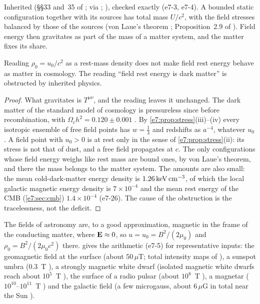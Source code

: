 Inherited (\S\S33 and~35 of \cite{LandauLifshitz2}; \cite{Rainich1925} via \cite{RE}; \cite{WeinbergCosmo08}), checked exactly (e7-3, e7-4). A
bounded static configuration together with its sources has total mass $U/c^2$, with the field stresses balanced by those of the sources (von Laue's
theorem \cite{Laue1911}; Proposition~2.9 of \cite{RE}). Field energy then gravitates as part of the mass of a matter system, and the matter fixes
its share.

\begin{corollary}
\label{e7:cor:dm}
Reading $\rho_0=u_0/c^2$ as a rest-mass density does not make field rest energy behave as matter in cosmology. The reading ``field rest energy is
dark matter'' is obstructed by inherited physics.
\end{corollary}

\begin{proof}
What gravitates is $T^{\mu\nu}$, and the reading leaves it unchanged. The dark matter of the standard model of cosmology is pressureless
since before recombination, with $\Omega_ch^2=0.120\pm0.001$ \cite{Planck18VI}. By \cref{e7:prop:stress}(iii)--(iv) every isotropic ensemble
of free field points has $w=\tfrac13$ and redshifts as $a^{-4}$, whatever $u_0$. A field point with $u_0>0$ is at rest only in the sense of
\cref{e7:prop:stress}(ii): its stress is not that of dust, and a free field propagates at $c$. The only configurations whose field energy
weighs like rest mass are bound ones, by von Laue's theorem, and there the mass belongs to the matter system. The amounts are also small: the
mean cold-dark-matter energy density is $1.26\,{\rm keV\,cm^{-3}}$, of which the local galactic magnetic energy density is $7\times10^{-4}$ and the
mean rest energy of the CMB (\cref{e7:sec:cmb}) $1.4\times10^{-4}$ (e7-26). The cause of the obstruction is the tracelessness, not the deficit.
\end{proof}

The fields of astronomy are, to a good approximation, magnetic in the frame of the conducting matter, where $\mathbf E\approx0$, so $u=u_0=B^2/(2\mu_0)$
and $\rho_0=B^2/(2\mu_0c^2)$ there.  gives the arithmetic (e7-5) for representative inputs: the geomagnetic field at the surface
(about $50\,\mu$T; total intensity maps of \cite{Alken21}), a sunspot umbra ($0.3$~T \cite{Solanki03}), a strongly magnetic white dwarf (isolated
magnetic white dwarfs reach about $10^5$~T \cite{Ferrario15}), the surface of a radio pulsar (about $10^8$~T \cite{LorimerKramer05}), a magnetar
($10^{10}$--$10^{11}$~T \cite{KaspiBeloborodov17}) and the galactic field (a few microgauss, about $6\,\mu$G in total near the Sun
\cite{Beck16}).

